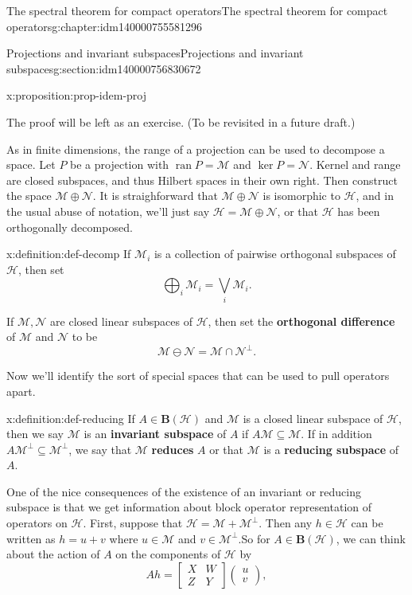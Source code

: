 \documentclass[oneside,10pt,]{book}
\newcommand{\terminology}[1]{\textbf{#1}}
\numberwithin{equation}{section}
\newcommand{\hilbert}{\mathcal{H}}
\newcommand{\M}{\mathcal{M}}
\newcommand{\N}{\mathcal{N}}
\newcommand{\BH}{\mathbf{B}(\mathcal{H})}
\newcommand{\ran}[1]{\operatorname{ran}#1}
\newcommand\bbm{\begin{bmatrix}}
\newcommand\ebm{\end{bmatrix}}
\newcommand\bpm{\begin{pmatrix}}
\newcommand\epm{\end{pmatrix}}
\numberwithin{equation}{section}
\newcommand{\amp}{&}
\begin{document}
\begin{chapterptx}{The spectral theorem for compact operators}{}{The spectral theorem for compact operators}{}{}{g:chapter:idm140000755581296}
\begin{sectionptx}{Projections and invariant subspaces}{}{Projections and invariant subspaces}{}{}{g:section:idm140000756830672}
\begin{proposition}{}{}{x:proposition:prop-idem-proj}
%
\end{proposition}
The proof will be left as an exercise. (To be revisited in a future draft.)%
\par
As in finite dimensions, the range of a projection can be used to decompose a space. Let \(P\) be a projection with \(\ran P = \M\) and \(\ker P = \N\). Kernel and range are closed subspaces, and thus Hilbert spaces in their own right. Then construct the space \(\M \oplus \N\). It is straighforward that \(\M \oplus \N\) is isomorphic to \(\hilbert\), and in the usual abuse of notation, we'll just say \(\hilbert = \M \oplus \N\), or that \(\hilbert\) has been orthogonally decomposed.%
\begin{definition}{}{x:definition:def-decomp}%
If \(\M_i\) is a collection of pairwise orthogonal subspaces of \(\hilbert\), then set%
\begin{equation*}
\bigoplus_{i} \M_i = \bigvee_i \M_i.
\end{equation*}
%
\par
If \(\M, \N\) are closed linear subspaces of \(\hilbert\), then set the \terminology{orthogonal difference} of \(\M\) and \(\N\) to be%
\begin{equation*}
\M \ominus \N = \M \cap \N^\perp.
\end{equation*}
%
\end{definition}
Now we'll identify the sort of special spaces that can be used to pull operators apart.%
\begin{definition}{}{x:definition:def-reducing}%
If \(A \in \BH\) and \(\M\) is a closed linear subspace of \(\hilbert\), then we say \(\M\) is an \terminology{invariant subspace} of \(A\) if \(A\M \subseteq \M\). If in addition \(A \M^\perp \subseteq \M^\perp\), we say that \(\M\) \terminology{reduces} \(A\) or that \(\M\) is a \terminology{reducing subspace} of \(A\).%
\end{definition}
One of the nice consequences of the existence of an invariant or reducing subspace is that we get information about block operator representation of operators on \(\hilbert\). First, suppose that \(\hilbert = \M + \M^\perp\). Then any \(h \in \hilbert\) can be written as \(h = u + v\) where \(u \in \M\) and \(v \in \M^\perp\).So for \(A \in \BH\), we can think about the action of \(A\) on the components of \(\hilbert\) by%
\begin{equation*}
Ah = \bbm X \amp W \\ Z \amp Y \ebm \bpm u \\ v \epm,
\end{equation*}

\end{sectionptx}
\end{chapterptx}
\end{document}
